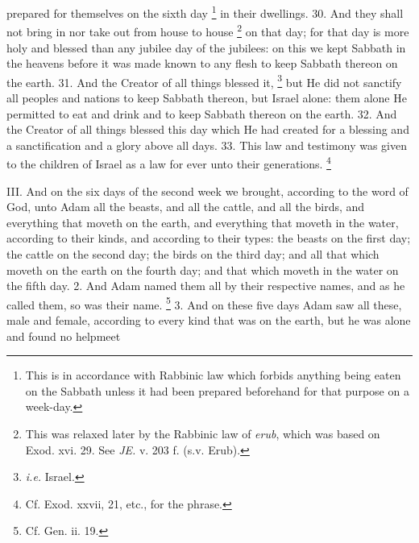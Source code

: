 prepared for themselves on the sixth day \footnote{This is in accordance with Rabbinic law which forbids anything being eaten on the Sabbath unless it had been prepared beforehand for that purpose on a week-day.} in their dwellings. 30. And they shall not bring in nor take out from house to house \footnote{This was relaxed later by the Rabbinic law of \emph{erub}, which was based on Exod. xvi. 29. See \emph{JE.} v. 203 f. (s.v. Erub).} on that day; for that day is more holy and blessed than any jubilee day of the jubilees: on this we kept Sabbath in the heavens before it was made known to any flesh to keep Sabbath thereon on the earth. 31. And the Creator of all things blessed it, \footnote{\emph{i.e.} Israel.} but He did not sanctify all peoples and nations to keep Sabbath thereon, but Israel alone: them alone He permitted to eat and drink and to keep Sabbath thereon on the earth. 32. And the Creator of all things blessed this day which He had created for a blessing and a sanctification and a glory above all days. 33. This law and testimony was given to the children of Israel as a law for ever unto their generations. \footnote{Cf. Exod. xxvii, 21, etc., for the phrase.}


III. And on the six days of the second week we brought, according to the word of God, unto Adam all the beasts, and all the cattle, and all the birds, and everything that moveth on the earth, and everything that moveth in the water, according to their kinds, and according to their types: the beasts on the first day; the cattle on the second day; the birds on the third day; and all that which moveth on the earth on the fourth day; and that which moveth in the water on the fifth day. 2. And Adam named them all by their respective names, and as he called them, so was their name. \footnote{Cf. Gen. ii. 19.} 3. And on these five days Adam saw all these, male and female, according to every kind that was on the earth, but he was alone and found no helpmeet

